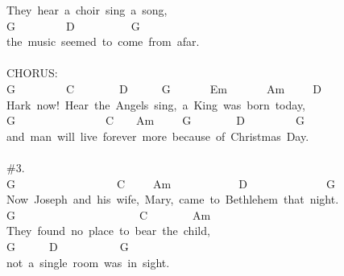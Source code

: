 \documentclass[]{book}
\begin{document}
They~hear~a~choir~sing~a~song,~~\\
\hspace*{0.333em}\hspace*{0.333em}\hspace*{0.333em}\hspace*{0.333em}\hspace*{0.333em}\hspace*{0.333em}\hspace*{0.333em}\hspace*{0.333em}\hspace*{0.333em}\hspace*{0.333em}G~~~~~~~~~D~~~~~~~~~~G~\\
the~music~seemed~to~come~from~afar.~~\\
\hspace*{0.333em}\hspace*{0.333em}\\
CHORUS:\\
G~~~~~~~~~C~~~~~~~~D~~~~~~G~~~~~~~Em~~~~~~~Am~~~~~D~\\
Hark~now!~Hear~the~Angels~sing,~a~King~was~born~today,~\\
\hspace*{0.333em}\hspace*{0.333em}\hspace*{0.333em}\hspace*{0.333em}G~~~~~~~~~~~~~~~~C~~~~Am~~~~~G~~~~~~~~D~~~~~~~~~G~\\
and~man~will~live~forever~more~because~of~Christmas~Day.~~\\
\hspace*{0.333em}\hspace*{0.333em}\\
\#3.~~~\\
G~~~~~~~~~~~~~~~~~~C~~~~~Am~~~~~~~~~~~~D~~~~~~~~~~~~~~G~\\
Now~Joseph~and~his~wife,~Mary,~came~to~Bethlehem~that~night.~\\
G~~~~~~~~~~~~~~~~~~~~~~C~~~~~~~~Am~\\
They~found~no~place~to~bear~the~child,~~\\
\hspace*{0.333em}\hspace*{0.333em}\hspace*{0.333em}\hspace*{0.333em}\hspace*{0.333em}\hspace*{0.333em}G~~~~~~D~~~~~~~~~~~G~\\
not~a~single~room~was~in~sight.~~~~~~\\
\end{document}
